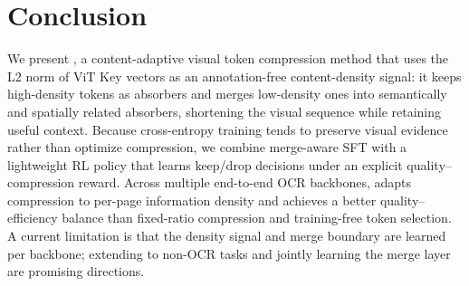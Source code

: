   \section{Conclusion}
  \label{sec:conclusion}

  We present \ours{}, a content-adaptive visual token compression method that uses
  the L2 norm of ViT Key vectors as an annotation-free content-density signal: it keeps high-density tokens as
  absorbers and merges low-density ones into semantically and spatially related absorbers,
  shortening the visual sequence while retaining useful context. Because cross-entropy training tends to
  preserve visual evidence rather than optimize compression, we combine merge-aware SFT with a lightweight RL
  policy that learns keep/drop decisions under an explicit quality--compression reward. Across
  multiple end-to-end OCR backbones, \ours{} adapts compression to per-page information density and achieves a better quality--efficiency
  balance than fixed-ratio compression and training-free token selection.
  A current limitation is that the density signal and merge boundary are learned per backbone; extending \ours{} to non-OCR tasks and jointly learning the merge layer are promising directions.

